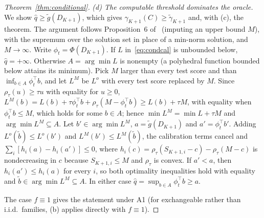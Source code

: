 \begin{proof}[Theorem~\ref{thm:conditional}]
\emph{(d) The computable threshold dominates the oracle.} We show $\hat q\ge\tilde g(D_{K+1})$, which gives $\gamma_{K+1}(C)\ge\tilde\gamma_{K+1}$ and, with (c), the theorem. The argument follows Proposition~6 of~\cite{gibbs2025conformal} (imputing an upper bound $M$), with the supremum over the solution set in place of a min-norm solution, and $M\to\infty$. Write $\phi_t=\Phi(D_{K+1})$. If $L$ in~\eqref{eq:condcal} is unbounded below, $\hat q=+\infty$. Otherwise $A=\arg\min L$ is nonempty (a polyhedral function bounded below attains its minimum). Pick $M$ larger than every test score and than $\inf_{b\in A}\phi_t^\top b$, and let $L^M$ be $L^o$ with every test score replaced by $M$. Since $\rho_\tau(u)\ge\tau u$ with equality for $u\ge0$, $L^M(b)=L(b)+\tau\phi_t^\top b+\rho_\tau(M-\phi_t^\top b)\ge L(b)+\tau M$, with equality when $\phi_t^\top b\le M$, which holds for some $b\in A$; hence $\min L^M=\min L+\tau M$ and $\arg\min L^M\subseteq A$. Let $b'\in\arg\min L^M$, $a=\tilde g(D_{K+1})$ and $a'=\phi_t^\top b'$. Adding $L^o(\tilde b)\le L^o(b')$ and $L^M(b')\le L^M(\tilde b)$, the calibration terms cancel and $\sum_i[h_i(a)-h_i(a')]\le0$, where $h_i(c)=\rho_\tau(S_{K+1,i}-c)-\rho_\tau(M-c)$ is nondecreasing in $c$ because $S_{K+1,i}\le M$ and $\rho_\tau$ is convex. If $a'<a$, then $h_i(a')\le h_i(a)$ for every $i$, so both optimality inequalities hold with equality and $\tilde b\in\arg\min L^M\subseteq A$. In either case $\hat q=\sup_{b\in A}\phi_t^\top b\ge a$.

The case $f\equiv1$ gives the statement under A1 (for exchangeable rather than i.i.d.\ families, (b) applies directly with $f\equiv1$).
\end{proof}

